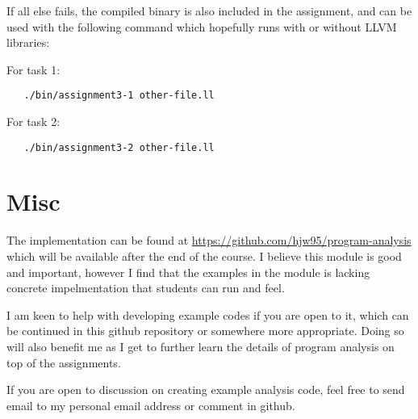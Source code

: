 \documentclass[11pt,a4paper,fleqn]{article}
\begin{document}
If all else fails, the compiled binary is also included in the assignment, and can be used with the following command which hopefully runs with or without LLVM libraries:

For task 1:
\begin{verbatim}
   ./bin/assignment3-1 other-file.ll
\end{verbatim}

For task 2:
\begin{verbatim}
   ./bin/assignment3-2 other-file.ll
\end{verbatim}

\section {Misc}

The implementation can be found at \url{https://github.com/hjw95/program-analysis} which will be available after the end of the course.
I believe this module is good and important, however I find that the examples in the module is lacking concrete impelmentation that students can run and feel.

I am keen to help with developing example codes if you are open to it, which can be continued in this github repository or somewhere more appropriate.
Doing so will also benefit me as I get to further learn the details of program analysis on top of the assignments.

If you are open to discussion on creating example analysis code, feel free to send email to my personal email address or comment in github.
\end{document}
